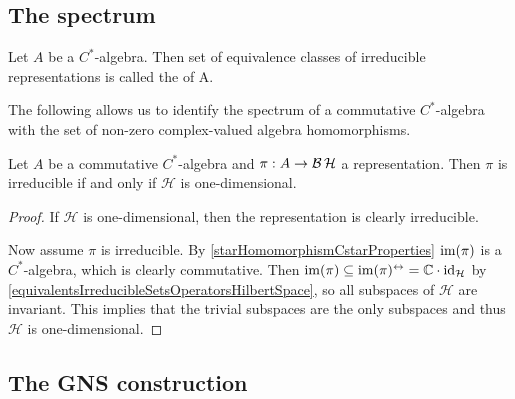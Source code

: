 \subsection{The spectrum}
\begin{definition}
Let $A$ be a $C^*$-algebra. Then set of equivalence classes of irreducible
representations is called the  of A.
\end{definition}

The following allows us to identify the spectrum of a commutative $C^*$-algebra with the set of non-zero complex-valued algebra homomorphisms.

\begin{proposition}
Let $A$ be a commutative $C^*$-algebra and $\pi: A\to \operatorname{\mathcal{B}}{\mathcal{H}}$ a representation. Then $\pi$ is irreducible \textup{if and only if} $\mathcal{H}$ is one-dimensional.
\end{proposition}
\begin{proof}
If $\mathcal{H}$ is one-dimensional, then the representation is clearly irreducible.

Now assume $\pi$ is irreducible.
By \ref{starHomomorphismCstarProperties} $\operatorname{im}(\pi)$ is a $C^*$-algebra, which is clearly commutative. Then $\operatorname{im}(\pi) \subseteq \operatorname{im}(\pi)^\leftrightarrow = \mathbb{C}\cdot \operatorname{id}_\mathcal{H}$ by \ref{equivalentsIrreducibleSetsOperatorsHilbertSpace}, so all subspaces of $\mathcal{H}$ are invariant. This implies that the trivial subspaces are the only subspaces and thus $\mathcal{H}$ is one-dimensional.
\end{proof}

\subsection{The GNS construction}


